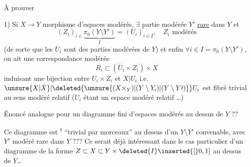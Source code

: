 À prouver

1) Si $X\to Y$ morphisme d'espaces modérés, $\exists$ partie modérée $Y'$ \uline{rare} dans $Y$ et
\[
(Z_i)_{i\in}\underbrace{\pi_0(Y\setminus Y')}_{I}=(U_i)_{i\in I},\quad Z_i\text{ modérés}
\]
(de sorte que les $\overline U_i$ sont des parties modérées de $Y$) et enfin $\forall i\in I=\pi_0(Y\setminus Y')$, on ait une correspondance modérée
\[
R_i\subset(\overline U_i\times Z_i)\times X
\]
induisant une bijection entre $U_i\times Z_i$ et $X|U_i$ i.e. $\unsure{X|\dot X}|\deleted{\unsure{(X\times_Y)|(Y\setminus Y_i)|(Y\setminus Y\prime)}}U_i$ est fibré  trivial au sens modéré relatif ($U_i$ étant un espace modéré relatif \ldots)

Énoncé analogue pour un diagramme fini d'espaces modérés au dessus de $Y$ ??

Ce diagramme est \textsuperscript{t} ``trivial par morceaux'' au dessus d'un $Y\setminus Y'$ convenable, avec $Y'$ modéré rare dans $Y$ ??? Ce serait déjà intéressant dans le cas particulier d'un diagramme de la forme $Z\subset X\subset Y\times\deleted{I}\inserted{[}0,1]$ \deleted{$\unsure{(I\subset[0,|(I=[0,}$} au dessus de $Y$\ldots

